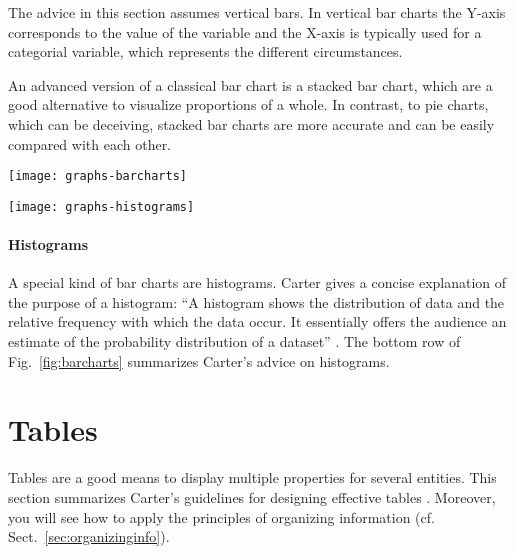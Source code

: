 The advice in this section assumes vertical bars. In vertical bar charts the Y-axis corresponds to the value of the variable and the X-axis is typically used for a categorial variable, which represents the different circumstances.

An advanced version of a classical bar chart is a stacked bar chart, which are a good alternative to visualize proportions of a whole. In contrast, to pie charts, which can be deceiving, stacked bar charts are more accurate and can be easily compared with each other.

\begin{figure*}[t]
\centering
\vspace{4\baselineskip}
\texttt{[image: graphs-barcharts]}

\bigskip

\texttt{[image: graphs-histograms]}
\end{figure*}

\paragraph{Histograms} A special kind of bar charts are histograms. Carter gives a concise explanation of the purpose of a histogram: ``A histogram shows the distribution of data and the relative frequency with which the data occur. It essentially offers the audience an estimate of the probability distribution of a dataset'' \cite{Carter12}. The bottom row of Fig.~\ref{fig:barcharts} summarizes Carter's advice on histograms.







\section{Tables}
\label{sec:tableguide}

Tables are a good means to display multiple properties for several entities. This section summarizes Carter's guidelines for designing effective tables \cite{Carter12}. Moreover, you will see how to apply the principles of organizing information (cf. Sect.~\ref{sec:organizinginfo}).


